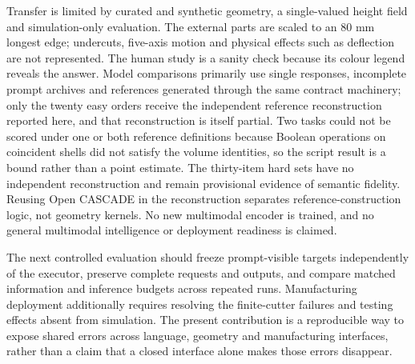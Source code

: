 Transfer is limited by curated and synthetic geometry, a single-valued height field and simulation-only evaluation. The external parts are scaled to an 80 mm longest edge; undercuts, five-axis motion and physical effects such as deflection are not represented. The human study is a sanity check because its colour legend reveals the answer. Model comparisons primarily use single responses, incomplete prompt archives and references generated through the same contract machinery; only the twenty easy orders receive the independent reference reconstruction reported here, and that reconstruction is itself partial. Two tasks could not be scored under one or both reference definitions because Boolean operations on coincident shells did not satisfy the volume identities, so the script result is a bound rather than a point estimate. The thirty-item hard sets have no independent reconstruction and remain provisional evidence of semantic fidelity. Reusing Open CASCADE in the reconstruction separates reference-construction logic, not geometry kernels. No new multimodal encoder is trained, and no general multimodal intelligence or deployment readiness is claimed.

The next controlled evaluation should freeze prompt-visible targets independently of the executor, preserve complete requests and outputs, and compare matched information and inference budgets across repeated runs. Manufacturing deployment additionally requires resolving the finite-cutter failures and testing effects absent from simulation. The present contribution is a reproducible way to expose shared errors across language, geometry and manufacturing interfaces, rather than a claim that a closed interface alone makes those errors disappear.
